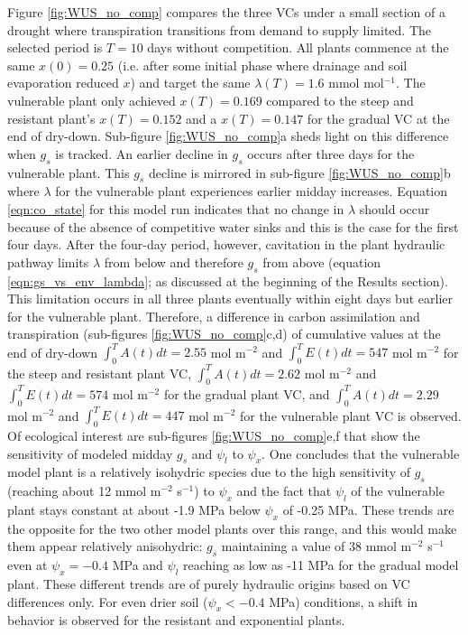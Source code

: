 \documentclass[utf8]{frontiersSCNS} %
\begin{document}
Figure \ref{fig:WUS_no_comp} compares the three VCs under a small section of a drought where transpiration transitions from demand to supply limited. The selected period is $T=10$ days without competition. All plants commence at the same $x(0)=0.25$ (i.e. after some initial phase where drainage and soil evaporation reduced $x$) and target the same $\lambda(T)=1.6$ mmol mol$^{-1}$. The vulnerable plant only achieved $x(T)=0.169$ compared to the steep and resistant plant's $x(T)=0.152$ and a $x(T)=0.147$ for the gradual VC at the end of dry-down. Sub-figure \ref{fig:WUS_no_comp}a sheds light on this difference when $g_s$ is tracked. An earlier decline in $g_s$ occurs after three days for the vulnerable plant. This $g_s$ decline is mirrored in sub-figure \ref{fig:WUS_no_comp}b where $\lambda$ for the vulnerable plant experiences earlier midday increases. Equation \ref{eqn:co_state} for this model run indicates that no change in $\lambda$ should occur because of the absence of competitive water sinks and this is the case for the first four days. After the four-day period, however, cavitation in the plant hydraulic pathway limits $\lambda$ from below and therefore $g_s$ from above (equation \ref{eqn:gs_vs_env_lambda}; as discussed at the beginning of the Results section). This limitation occurs in all three plants eventually within eight days but earlier for the vulnerable plant. Therefore, a difference in carbon assimilation and transpiration (sub-figures \ref{fig:WUS_no_comp}c,d) of cumulative values at the end of dry-down $\int_0^TA(t)dt= 2.55$ mol m$^{-2}$ and $\int_0^TE(t)dt= 547$ mol m$^{-2}$ for the steep and resistant plant VC, $\int_0^TA(t)dt= 2.62$ mol m$^{-2}$ and $\int_0^TE(t)dt= 574$ mol m$^{-2}$ for the gradual plant VC, and $\int_0^TA(t)dt= 2.29$ mol m$^{-2}$ and $\int_0^TE(t)dt= 447$ mol m$^{-2}$ for the vulnerable plant VC is observed. Of ecological interest are sub-figures \ref{fig:WUS_no_comp}e,f that show the sensitivity of modeled midday $g_s$ and $\psi_l$ to $\psi_x$. One concludes that the vulnerable model plant is a relatively isohydric species due to the high sensitivity of $g_s$ (reaching about 12 mmol m$^{-2}$ s$^{-1}$) to $\psi_x$ and the fact that $\psi_l$ of the vulnerable plant stays constant at about -1.9 MPa below $\psi_x$ of -0.25 MPa. These trends are the opposite for the two other model plants over this range, and this would make them appear relatively anisohydric: $g_s$ maintaining a value of 38 mmol m$^{-2}$ s$^{-1}$ even at $\psi_x = -0.4$ MPa and $\psi_l$ reaching as low as -11 MPa for the gradual model plant. These different trends are of purely hydraulic origins based on VC differences only. For even drier soil ($\psi_x < -0.4$ MPa) conditions, a shift in behavior is observed for the resistant and exponential plants. 
\end{document}
